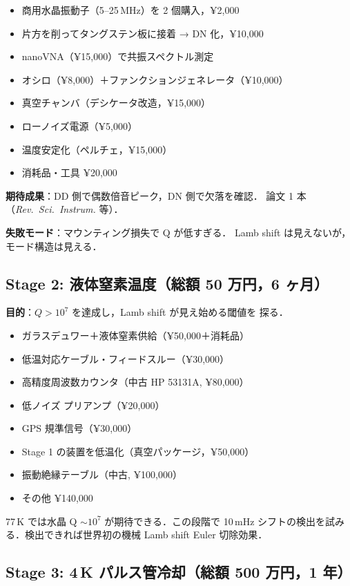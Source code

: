 \documentclass[11pt,a4paper]{article}
\begin{document}
\begin{itemize}
\item 商用水晶振動子（5--25\,MHz）を 2 個購入，¥2,000
\item 片方を削ってタングステン板に接着 → DN 化，¥10,000
\item nanoVNA（¥15,000）で共振スペクトル測定
\item オシロ（¥8,000）＋ファンクションジェネレータ（¥10,000）
\item 真空チャンバ（デシケータ改造，¥15,000）
\item ローノイズ電源（¥5,000）
\item 温度安定化（ペルチェ，¥15,000）
\item 消耗品・工具 ¥20,000
\end{itemize}

\textbf{期待成果}：DD 側で偶数倍音ピーク，DN 側で欠落を確認．
論文 1 本（\textit{Rev.\ Sci.\ Instrum.} 等）．

\textbf{失敗モード}：マウンティング損失で Q が低すぎる．
Lamb shift は見えないが，モード構造は見える．

\subsection{Stage 2: 液体窒素温度（総額 50 万円，6 ヶ月）}

\textbf{目的}：$Q > 10^7$ を達成し，Lamb shift が見え始める閾値を
探る．

\begin{itemize}
\item ガラスデュワー＋液体窒素供給（¥50,000＋消耗品）
\item 低温対応ケーブル・フィードスルー（¥30,000）
\item 高精度周波数カウンタ（中古 HP 53131A, ¥80,000）
\item 低ノイズ プリアンプ（¥20,000）
\item GPS 規準信号（¥30,000）
\item Stage 1 の装置を低温化（真空パッケージ，¥50,000）
\item 振動絶縁テーブル（中古, ¥100,000）
\item その他 ¥140,000
\end{itemize}

77\,K では水晶 Q $\sim 10^7$ が期待できる．この段階で 10\,mHz
シフトの検出を試みる．検出できれば世界初の機械 Lamb shift
Euler 切除効果．

\subsection{Stage 3: 4\,K パルス管冷却（総額 500 万円，1 年）}
\end{document}
